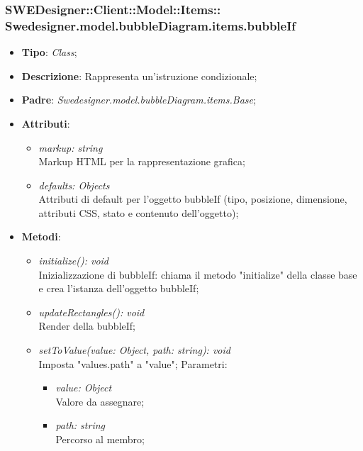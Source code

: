 \documentclass[../DefinizioneDiProdotto.tex]{subfiles}
\begin{document}
			\subsubsection[Swedesigner.model.bubbleDiagram.items.bubbleIf]{SWEDesigner::Client::Model::Items::\\Swedesigner.model.bubbleDiagram.items.bubbleIf}
			\hypertarget{SWEDesigner::Client::Model::Items::Swedesigner.model.bubbleDiagram.items.bubbleIf}{}
			\begin{itemize}
				\item \textbf{Tipo}: \emph{Class};
				\item \textbf{Descrizione}: Rappresenta un'istruzione condizionale;
				\item \textbf{Padre}: \emph{Swedesigner.model.bubbleDiagram.items.Base};
				\item \textbf{Attributi}:
				\begin{itemize}
					\item \emph{markup: string}\\
					Markup HTML per la rappresentazione grafica;
					\item \emph{defaults: Objects}\\
					Attributi di default per l'oggetto bubbleIf (tipo, posizione, dimensione, attributi CSS, stato e contenuto dell'oggetto);
				\end{itemize}
				\item \textbf{Metodi}:
				\begin{itemize}
					\item \emph{initialize(): void}\\
					Inizializzazione di bubbleIf: chiama il metodo "initialize" della classe base e crea l'istanza dell'oggetto bubbleIf;
					\item \emph{updateRectangles(): void}\\
					Render della bubbleIf;
					\item \emph{setToValue(value: Object, path: string): void}\\
					Imposta "values.path" a "value";
					Parametri:
					\begin{itemize}
						\item \emph{value: Object} \\
						Valore da assegnare;
						\item \emph{path: string} \\
						Percorso al membro;
					\end{itemize}
				\end{itemize}
			\end{itemize}
			
\end{document}

